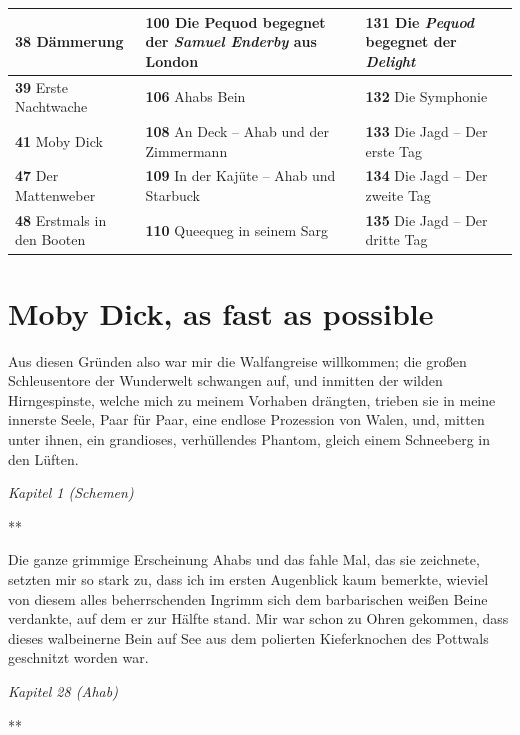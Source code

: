 \documentclass[a5paper,9pt,twoside=false]{extbook}
\begin{document}
{\begin{tabularx}{\textwidth}{X|X|X}
    \textbf{38} Dämmerung & \textbf{100} Die Pequod begegnet der \textit{Samuel Enderby} aus London & \textbf{131} Die \textit{Pequod} begegnet der \textit{Delight} \\ \hline 
    \textbf{39} Erste Nachtwache & \textbf{106} Ahabs Bein & \textbf{132} Die Symphonie \\ \hline 
    \textbf{41} Moby Dick & \textbf{108} An Deck -- Ahab und der Zimmermann & \textbf{133} Die Jagd -- Der erste Tag \\ \hline 
    \textbf{47} Der Mattenweber & \textbf{109} In der Kajüte -- Ahab und Starbuck & \textbf{134} Die Jagd -- Der zweite Tag \\ \hline 
    \textbf{48} Erstmals in den Booten & \textbf{110} Queequeg in seinem Sarg & \textbf{135} Die Jagd -- Der dritte Tag
 \end{tabularx}
 }
\normalsize


\newpage
\section*{Moby Dick, as fast as possible}\label{textstellen}

\noindent Aus diesen Gründen also war mir die Walfangreise willkommen; die großen Schleusentore der Wunderwelt schwangen auf, und inmitten der wilden Hirngespinste, welche mich zu meinem Vorhaben drängten, trieben sie in meine innerste Seele, Paar für Paar, eine endlose Prozession von Walen, und, mitten unter ihnen, ein grandioses, verhüllendes Phantom, gleich einem Schneeberg in den Lüften.

\medskip
\noindent\footnotesize{\textit{Kapitel 1 (Schemen)}}
\normalsize

\medskip
{\centering \small*** \\}
\bigskip

\noindent Die ganze grimmige Erscheinung Ahabs und das fahle Mal, das sie zeichnete, setzten mir so stark zu, dass ich im ersten Augenblick kaum bemerkte, wieviel von diesem alles beherrschenden Ingrimm sich dem barbarischen weißen Beine verdankte, auf dem er zur Hälfte stand. Mir war schon zu Ohren gekommen, dass dieses walbeinerne Bein auf See aus dem polierten Kieferknochen des Pottwals geschnitzt worden war.

\medskip
\noindent\footnotesize{\textit{Kapitel 28 (Ahab)}}
\normalsize

\medskip
{\centering \small*** \\}
\bigskip
\end{document}
